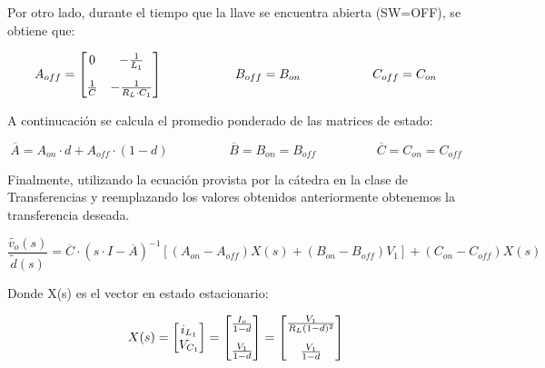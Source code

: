 \documentclass[e4_tp2_main.tex]{subfiles}
\begin{document}
Por otro lado, durante el tiempo que la llave se encuentra abierta (SW=OFF), se obtiene que: 

\begin{equation}
A_{off} = 
\begin{bmatrix}
{0} & {- \frac{1}{L_1}} \vspace{0.3cm}\\ 
{\frac{1}{C}} & {-\frac{1}{R_L \cdot C_1}}
\end{bmatrix}  
\hspace{2cm} B_{off}=B_{on}  
\hspace{2cm} C_{off} = C_{on}
\end{equation}


A continucaci\'on se calcula el promedio ponderado de las matrices de estado:

\begin{equation}
\overline{A} = A_{on} \cdot d + A_{off} \cdot (1-d) \hspace{2cm} \overline{B}=B_{on} = B_{off}  \hspace{2cm} \overline{C}=C_{on} = C_{off}  
\end{equation}

Finalmente, utilizando la ecuaci\'on provista por la c\'atedra en la clase de Transferencias y reemplazando los valores obtenidos anteriormente obtenemos la transferencia deseada. 

\begin{equation}
\frac{ \widetilde{v_o}(s)}{\widetilde{d}(s)}= \overline{C} \cdot (s \cdot I - \overline{A})^{-1} \left[ (A_{on} - A_{off})X(s) + (B_{on} - B_{off}) V_1 \right] +(C_{on} - C_{off})X(s) 
\label{ec1.3}
\end{equation}

Donde X(s) es el vector en estado estacionario:

\begin{equation}
X(s)= 
\begin{bmatrix}
{i_{L_1}} \\
{V_{C_1}} 
\end{bmatrix}
=
\begin{bmatrix}
{\frac{I_o}{1-d}} \vspace{0.3cm} \\
{\frac{V_1}{1-d}} 
\end{bmatrix}
=
\begin{bmatrix}
{\frac{V_1}{R_L(1-d)^2}} \vspace{0.3cm} \\
{\frac{V_1}{1-d}} 
\end{bmatrix}
\end{equation}
\end{document}
